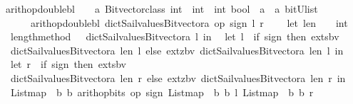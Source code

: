 \begin{isabellebody}
{}\isanewline
{}\isamarkupfalse%
\ arith{\isacharunderscore}op{\isacharunderscore}double{\isacharunderscore}bl\ \ {\isacharcolon}{\isacharcolon}\ {\isachardoublequoteopen}\ {\isacharprime}a\ Bitvector{\isacharunderscore}class\ {\isasymRightarrow}{\isacharparenleft}int\ {\isasymRightarrow}\ int\ {\isasymRightarrow}\ int{\isacharparenright}{\isasymRightarrow}\ bool\ {\isasymRightarrow}\ {\isacharprime}a\ {\isasymRightarrow}\ {\isacharprime}a\ {\isasymRightarrow}{\isacharparenleft}bitU{\isacharparenright}list\ {\isachardoublequoteclose}\ \ \ \isanewline
\ \ \ \ \ {\isachardoublequoteopen}\ arith{\isacharunderscore}op{\isacharunderscore}double{\isacharunderscore}bl\ dict{\isacharunderscore}Sail{}{\isacharunderscore}values{\isacharunderscore}Bitvector{\isacharunderscore}a\ op{}\ sign\ l\ r\ {\isacharequal}\ {\isacharparenleft}\isanewline
\ \ {\isacharparenleft}let\ len\ {\isacharequal}{\isacharparenleft}{\isacharparenleft}\ {}\ {\isacharcolon}{\isacharcolon}\ int{\isacharparenright}\ {\isacharasterisk}\isanewline
\ \ {\isacharparenleft}length{\isacharunderscore}method\ \ \ dict{\isacharunderscore}Sail{}{\isacharunderscore}values{\isacharunderscore}Bitvector{\isacharunderscore}a{\isacharparenright}\ l{\isacharparenright}\ in\isanewline
\ \ {\isacharparenleft}let\ l{\isacharprime}\ {\isacharequal}\ {\isacharparenleft}if\ sign\ then\ exts{\isacharunderscore}bv\ \isanewline
\ \ dict{\isacharunderscore}Sail{}{\isacharunderscore}values{\isacharunderscore}Bitvector{\isacharunderscore}a\ len\ l\ else\ extz{\isacharunderscore}bv\ dict{\isacharunderscore}Sail{}{\isacharunderscore}values{\isacharunderscore}Bitvector{\isacharunderscore}a\ len\ l{\isacharparenright}\ in\isanewline
\ \ {\isacharparenleft}let\ r{\isacharprime}\ {\isacharequal}\ {\isacharparenleft}if\ sign\ then\ exts{\isacharunderscore}bv\ \isanewline
\ \ dict{\isacharunderscore}Sail{}{\isacharunderscore}values{\isacharunderscore}Bitvector{\isacharunderscore}a\ len\ r\ else\ extz{\isacharunderscore}bv\ dict{\isacharunderscore}Sail{}{\isacharunderscore}values{\isacharunderscore}Bitvector{\isacharunderscore}a\ len\ r{\isacharparenright}\ in\isanewline
\ \ List{\isachardot}map\ {\isacharparenleft}{\isasymlambda}\ b{\isachardot}\ b{\isacharparenright}\ {\isacharparenleft}arith{\isacharunderscore}op{\isacharunderscore}bits\ op{}\ sign\ {\isacharparenleft}List{\isachardot}map\ {\isacharparenleft}{\isasymlambda}\ b{\isachardot}\ b{\isacharparenright}\ l{\isacharprime}{\isacharparenright}\ {\isacharparenleft}List{\isachardot}map\ {\isacharparenleft}{\isasymlambda}\ b{\isachardot}\ b{\isacharparenright}\ r{\isacharprime}{\isacharparenright}{\isacharparenright}{\isacharparenright}{\isacharparenright}{\isacharparenright}{\isacharparenright}{\isachardoublequoteclose}\isanewline

\end{isabellebody}
